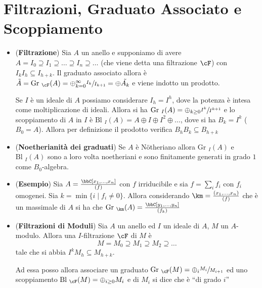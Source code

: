 \documentclass[a4paper,NoNotes,GeneralMath]{stdmdoc}
\newcommand{\Gr}{\text{Gr }}
\newcommand{\Bl}{\text{Bl }}
\begin{document}
\section*{Filtrazioni, Graduato Associato e Scoppiamento}
\begin{itemize}
\item ({\bf Filtrazione}) Sia $A$ un anello e supponiamo di avere
  $A = I_0 \supseteq I_1 \supseteq \ldots \supseteq I_n \supseteq
  \ldots$ (che viene detta una filtrazione $\cF$) con
  $I_k I_h \subseteq I_{h + k}$. Il graduato associato allora è
  $\tilde{A} = \Gr_\cF (A) = \oplus_{k=0}^\infty \sfrac{I_k}{I_{k+1}} =
  \oplus \tilde{A_k}$ e viene indotto un prodotto.

  Se $I$ è un ideale di $A$ possiamo considerare $I_h = I^h$, dove la
  potenza è intesa come moltiplicazione di ideali. Allora si ha
  $\Gr_I (A) = \oplus_{k \ge 0} \sfrac{I^k}{I^{k+1}}$ e lo scoppiamento
  di $A$ in $I$ è $\Bl_I (A) = A \oplus I \oplus I^2 \oplus \ldots$,
  dove si ha $B_k = I^k$ ($B_0 = A$). Allora per definizione il prodotto
  verifica $B_h B_k \subseteq B_{h+k}$
\item ({\bf Noetherianità dei graduati}) Se $A$ è Nötheriano allora
  $\Gr_I (A)$ e $\Bl_I (A)$ sono a loro volta noetheriani e sono
  finitamente generati in grado $1$ come $B_0$-algebra.
\item ({\bf Esempio}) Sia $A = \frac{\bbC[x_1, \ldots, x_n]}{(f)}$ con
  $f$ irriducibile e sia $f = \sum_i f_i$ con $f_i$ omogenei. Sia
  $k = \min \{i \mid f_i \neq 0 \}$. Allora considerando
  $\km = \frac{(x_1, \ldots, x_n)}{(f)}$ che è un massimale di $A$ si ha
  che $\Gr_\km (A) = \frac{\bbC[y_1, \ldots, y_n]}{(f_k)}$
\item ({\bf Filtrazioni di Moduli}) Sia $A$ un anello ed $I$ un ideale
  di $A$, $M$ un $A$-modulo. Allora una $I$-filtrazione $\cF$ di $M$ è
  $$ M = M_0 \supseteq M_1 \supseteq M_2 \supseteq \ldots $$ tale che si
  abbia $I^k M_h \subseteq M_{h + k}$.

  Ad essa posso allora associare un graduato $\Gr_\cF (M) = \oplus_i
  \sfrac{M_i}{M_{i+1}}$ ed uno scoppiamento $\Bl_\cF (M) = \oplus_{i \ge
    0} M_i$ e di $M_i$ si dice che è ``di grado $i$''


\end{itemize}
\end{document}
